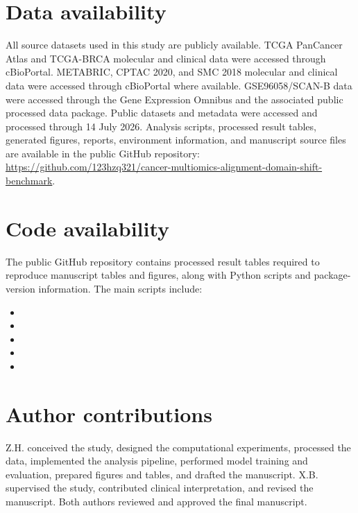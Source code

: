 \section*{Data availability}

All source datasets used in this study are publicly available. TCGA PanCancer Atlas and TCGA-BRCA molecular and clinical data were accessed through cBioPortal. METABRIC, CPTAC 2020, and SMC 2018 molecular and clinical data were accessed through cBioPortal where available. GSE96058/SCAN-B data were accessed through the Gene Expression Omnibus and the associated public processed data package. Public datasets and metadata were accessed and processed through 14 July 2026. Analysis scripts, processed result tables, generated figures, reports, environment information, and manuscript source files are available in the public GitHub repository: \url{https://github.com/123hzq321/cancer-multiomics-alignment-domain-shift-benchmark}.

\section*{Code availability}

The public GitHub repository contains processed result tables required to reproduce manuscript tables and figures, along with Python scripts and package-version information. The main scripts include:
\begingroup
\footnotesize
\begin{itemize}
\item {}
\item {}
\item {}
\item {}
\item {}
\end{itemize}
\endgroup

\section*{Author contributions}

Z.H. conceived the study, designed the computational experiments, processed the data, implemented the analysis pipeline, performed model training and evaluation, prepared figures and tables, and drafted the manuscript. X.B. supervised the study, contributed clinical interpretation, and revised the manuscript. Both authors reviewed and approved the final manuscript.

